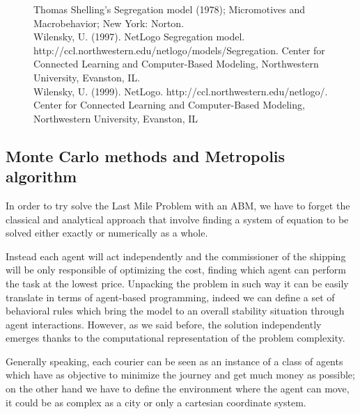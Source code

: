 \documentclass[11pt,a4paper]{article}
\begin{document}
\newpage
\begin{figure}[h!]
\centering
\caption{Thomas Shelling's Segregation model (1978); Micromotives and Macrobehavior; New York: Norton. \\
Wilensky, U. (1997). NetLogo Segregation model. http://ccl.northwestern.edu/netlogo/models/Segregation. Center for Connected Learning and Computer-Based Modeling, Northwestern University, Evanston, IL.\\
Wilensky, U. (1999). NetLogo. http://ccl.northwestern.edu/netlogo/. Center for Connected Learning and Computer-Based Modeling, Northwestern University, Evanston, IL}
\end{figure}
 
\subsection{Monte Carlo methods and Metropolis algorithm}
In order to try solve the Last Mile Problem with an ABM, we have to forget the classical and analytical approach that involve finding a system of equation to be solved either exactly or numerically as a whole.

Instead each agent will act independently and the commissioner of the shipping will be only responsible of optimizing the cost, finding which agent can perform the task at the lowest price.
Unpacking the problem in such way it can be easily translate in terms of agent-based programming, indeed we can define a set of behavioral rules which bring the model to an overall stability situation through agent interactions.
However, as we said before, the solution independently emerges thanks to the computational representation of the problem complexity. 

Generally speaking, each courier can be seen as an instance of a class of agents which have as objective to minimize the journey and get much money as possible; on the other hand we have to define the environment where the agent can move, it could be as complex as a city or only a cartesian coordinate system.



\newpage
\end{document}
